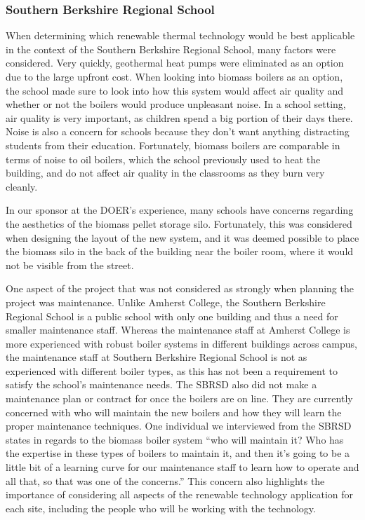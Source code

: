 \subsubsection{Southern Berkshire Regional School}
\par When determining which renewable thermal technology would be best applicable in the context of the Southern Berkshire Regional School, many factors were considered. Very quickly, geothermal heat pumps were eliminated as an option due to the large upfront cost. When looking into biomass boilers as an option, the school made sure to look into how this system would affect air quality and whether or not the boilers would produce unpleasant noise. In a school setting, air quality is very important, as children spend a big portion of their days there. Noise is also a concern for schools because they don’t want anything distracting students from their education. Fortunately, biomass boilers are comparable in terms of noise to oil boilers, which the school previously used to heat the building, and do not affect air quality in the classrooms as they burn very cleanly.
\par In our sponsor at the DOER’s experience, many schools have concerns regarding the aesthetics of the biomass pellet storage silo. Fortunately, this was considered when designing the layout of the new system, and it was deemed possible to place the biomass silo in the back of the building near the boiler room, where it would not be visible from the street.
\par One aspect of the project that was not considered as strongly when planning the project was maintenance. Unlike Amherst College, the Southern Berkshire Regional School is a public school with only one building and thus a need for smaller maintenance staff. Whereas the maintenance staff at Amherst College is more experienced with robust boiler systems in different buildings across campus, the maintenance staff at Southern Berkshire Regional School is not as experienced with different boiler types, as this has not been a requirement to satisfy the school’s maintenance needs. The SBRSD also did not make a maintenance plan or contract for once the boilers are on line. They are currently concerned with who will maintain the new boilers and how they will learn the proper maintenance techniques. One individual we interviewed from the SBRSD states in regards to the biomass boiler system “who will maintain it? Who has the expertise in these types of boilers to maintain it, and then it’s going to be a little bit of a learning curve for our maintenance staff to learn how to operate and all that, so that was one of the concerns.” This concern also highlights the importance of considering all aspects of the renewable technology application for each site, including the people who will be working with the technology.

